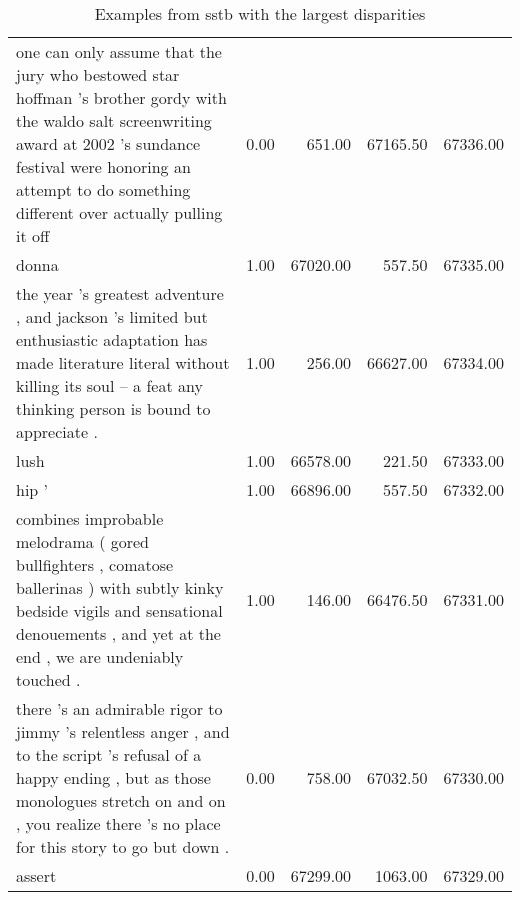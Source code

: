\documentclass[letterpaper]{article} %
\begin{document}
\begin{table*}[ht]
\begin{tabular}{p{8cm}rrrr}
		one can only assume that the jury who bestowed star hoffman 's brother gordy with the waldo salt screenwriting award at 2002 's sundance festival were honoring an attempt to do something different over actually pulling it off & 0.00 & 651.00 & 67165.50 & 67336.00 \\ 
		donna & 1.00 & 67020.00 & 557.50 & 67335.00 \\ 
		the year 's greatest adventure , and jackson 's limited but enthusiastic adaptation has made literature literal without killing its soul -- a feat any thinking person is bound to appreciate . & 1.00 & 256.00 & 66627.00 & 67334.00 \\ 
		lush & 1.00 & 66578.00 & 221.50 & 67333.00 \\ 
		hip ' & 1.00 & 66896.00 & 557.50 & 67332.00 \\ 
		combines improbable melodrama ( gored bullfighters , comatose ballerinas ) with subtly kinky bedside vigils and sensational denouements , and yet at the end , we are undeniably touched . & 1.00 & 146.00 & 66476.50 & 67331.00 \\ 
		there 's an admirable rigor to jimmy 's relentless anger , and to the script 's refusal of a happy ending , but as those monologues stretch on and on , you realize there 's no place for this story to go but down . & 0.00 & 758.00 & 67032.50 & 67330.00 \\ 
		assert & 0.00 & 67299.00 & 1063.00 & 67329.00 \\ 
		\hline
	\end{tabular}
	\caption{Examples from sstb with the largest disparities} 
	\label{tab:differences_sstb}
\end{table*}
\end{document}

